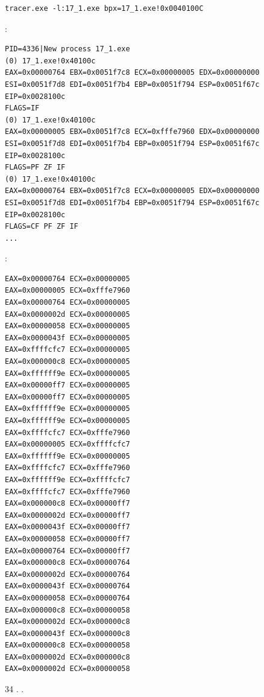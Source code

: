 \begin{lstlisting}
tracer.exe -l:17_1.exe bpx=17_1.exe!0x0040100C
\end{lstlisting}

:

\begin{lstlisting}
PID=4336|New process 17_1.exe
(0) 17_1.exe!0x40100c
EAX=0x00000764 EBX=0x0051f7c8 ECX=0x00000005 EDX=0x00000000
ESI=0x0051f7d8 EDI=0x0051f7b4 EBP=0x0051f794 ESP=0x0051f67c
EIP=0x0028100c
FLAGS=IF
(0) 17_1.exe!0x40100c
EAX=0x00000005 EBX=0x0051f7c8 ECX=0xfffe7960 EDX=0x00000000
ESI=0x0051f7d8 EDI=0x0051f7b4 EBP=0x0051f794 ESP=0x0051f67c
EIP=0x0028100c
FLAGS=PF ZF IF
(0) 17_1.exe!0x40100c
EAX=0x00000764 EBX=0x0051f7c8 ECX=0x00000005 EDX=0x00000000
ESI=0x0051f7d8 EDI=0x0051f7b4 EBP=0x0051f794 ESP=0x0051f67c
EIP=0x0028100c
FLAGS=CF PF ZF IF
...
\end{lstlisting}

  \AndENRU {} :

\begin{lstlisting}
EAX=0x00000764 ECX=0x00000005
EAX=0x00000005 ECX=0xfffe7960
EAX=0x00000764 ECX=0x00000005
EAX=0x0000002d ECX=0x00000005
EAX=0x00000058 ECX=0x00000005
EAX=0x0000043f ECX=0x00000005
EAX=0xffffcfc7 ECX=0x00000005
EAX=0x000000c8 ECX=0x00000005
EAX=0xffffff9e ECX=0x00000005
EAX=0x00000ff7 ECX=0x00000005
EAX=0x00000ff7 ECX=0x00000005
EAX=0xffffff9e ECX=0x00000005
EAX=0xffffff9e ECX=0x00000005
EAX=0xffffcfc7 ECX=0xfffe7960
EAX=0x00000005 ECX=0xffffcfc7
EAX=0xffffff9e ECX=0x00000005
EAX=0xffffcfc7 ECX=0xfffe7960
EAX=0xffffff9e ECX=0xffffcfc7
EAX=0xffffcfc7 ECX=0xfffe7960
EAX=0x000000c8 ECX=0x00000ff7
EAX=0x0000002d ECX=0x00000ff7
EAX=0x0000043f ECX=0x00000ff7
EAX=0x00000058 ECX=0x00000ff7
EAX=0x00000764 ECX=0x00000ff7
EAX=0x000000c8 ECX=0x00000764
EAX=0x0000002d ECX=0x00000764
EAX=0x0000043f ECX=0x00000764
EAX=0x00000058 ECX=0x00000764
EAX=0x000000c8 ECX=0x00000058
EAX=0x0000002d ECX=0x000000c8
EAX=0x0000043f ECX=0x000000c8
EAX=0x000000c8 ECX=0x00000058
EAX=0x0000002d ECX=0x000000c8
EAX=0x0000002d ECX=0x00000058
\end{lstlisting}

 34 .
.

